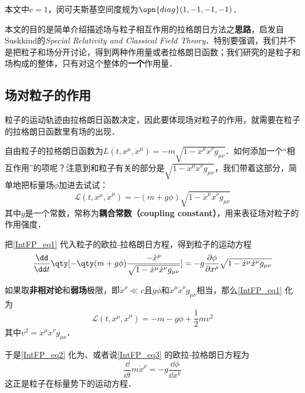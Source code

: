 

本文中$c=1$，闵可夫斯基空间度规为$\opn{diag}(1, -1, -1, -1)$．

本文的目的是简单介绍描述场与粒子相互作用的拉格朗日方法之\textbf{思路}，启发自Suskkind的\textsl{Special Relativity and Classical Field Theory}\cite{SusskindClassicalFields}．特别要强调，我们并不是把粒子和场分开讨论，得到两种作用量或者拉格朗日函数；我们研究的是粒子和场构成的整体，只有对这个整体的\textbf{一个}作用量．

\subsection{场对粒子的作用}

粒子的运动轨迹由拉格朗日函数决定，因此要体现场对粒子的作用，就需要在粒子的拉格朗日函数里有场的出现．

自由粒子的拉格朗日函数为$L(t, x^\mu, \dot{x}^\mu ) = -m\sqrt{1-\dot{x}^\mu \dot{x}^\nu g_{\mu\nu}}$．如何添加一个“相互作用”的项呢？注意到和粒子有关的部分是$\sqrt{1-\dot{x}^\mu \dot{x}^\nu g_{\mu\nu}}$，我们带着这部分，简单地把标量场$\phi$加进去试试：
\begin{equation}\label{IntFP_eq1}
\mathcal{L}(t, x^\mu, \dot{x}^\mu ) = -(m+g\phi)\sqrt{1-\dot{x}^\mu \dot{x}^\nu g_{\mu\nu}}
\end{equation}
其中$g$是一个常数，常称为\textbf{耦合常数（coupling constant）}，用来表征场对粒子的作用强度．

把\autoref{IntFP_eq1} 代入粒子的欧拉-拉格朗日方程，得到粒子的运动方程
\begin{equation}\label{IntFP_eq2}
\frac{\dd }{\dd t} \qty[-\qty(m+g\phi)\frac{-\dot{x}^\rho}{\sqrt{1-\dot{x}^\mu \dot{x}^\nu g_{\mu\nu}}}] = -g\frac{\partial \phi}{\partial x^\rho}\sqrt{1-\dot{x}^\mu \dot{x}^\nu g_{\mu\nu}}
\end{equation}

如果取\textbf{非相对论}和\textbf{弱场}极限，即$\dot{x}^\rho\ll c$且$g\phi$和$\dot{x}^\mu \dot{x}^\nu g_{\mu\nu}$相当，那么\autoref{IntFP_eq1} 化为
\begin{equation}\label{IntFP_eq3}
\mathcal{L}(t, x^\mu, \dot{x}^\mu ) = -m-g\phi+\frac{1}{2}mv^2
\end{equation}
其中$v^2=\dot{x}^\mu \dot{x}^\nu g_{\mu\nu}$．

于是\autoref{IntFP_eq2} 化为、或者说\autoref{IntFP_eq3} 的欧拉-拉格朗日方程为
\begin{equation}\label{IntFP_eq4}
\frac{\dd}{\dd t} m\dot{x}^\rho = -g\frac{\dd \phi}{\dd x^k}
\end{equation}
这正是粒子在标量势下的运动方程．

